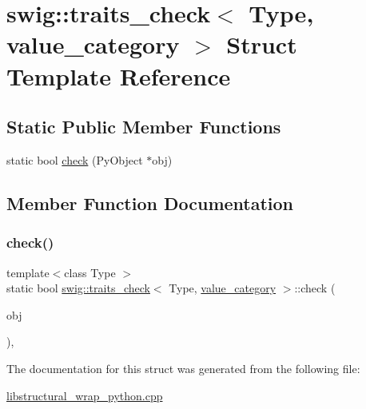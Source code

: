 \hypertarget{structswig_1_1traits__check_3_01_type_00_01value__category_01_4}{}\section{swig\+:\+:traits\+\_\+check$<$ Type, value\+\_\+category $>$ Struct Template Reference}
\label{structswig_1_1traits__check_3_01_type_00_01value__category_01_4}
\subsection*{Static Public Member Functions}
\begin{DoxyCompactItemize}
\item 
static bool \hyperlink{structswig_1_1traits__check_3_01_type_00_01value__category_01_4_a7b6a0811d1ac4cb4038c2eb8305411d0}{check} (Py\+Object $\ast$obj)
\end{DoxyCompactItemize}


\subsection{Member Function Documentation}
\mbox{\label{structswig_1_1traits__check_3_01_type_00_01value__category_01_4_a7b6a0811d1ac4cb4038c2eb8305411d0}} 
\subsubsection{\texorpdfstring{check()}{check()}}
{\footnotesize\ttfamily template$<$class Type $>$ \\
static bool \hyperlink{structswig_1_1traits__check}{swig\+::traits\+\_\+check}$<$ Type, \hyperlink{structswig_1_1value__category}{value\+\_\+category} $>$\+::check (\begin{DoxyParamCaption}\item[{Py\+Object $\ast$}]{obj }\end{DoxyParamCaption})\hspace{0.3cm}{\ttfamily [inline]}, {\ttfamily [static]}}



The documentation for this struct was generated from the following file\+:\begin{DoxyCompactItemize}
\item 
\hyperlink{libstructural__wrap__python_8cpp}{libstructural\+\_\+wrap\+\_\+python.\+cpp}\end{DoxyCompactItemize}
